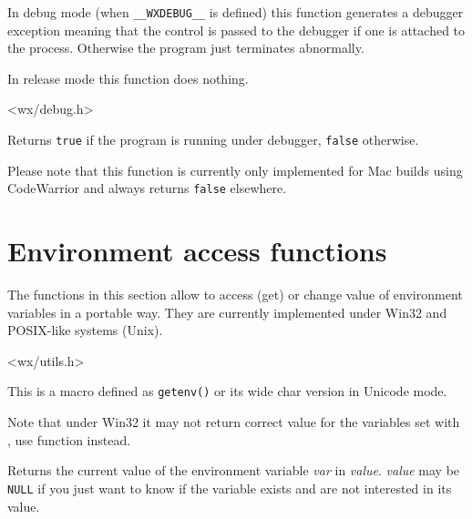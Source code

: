 
In debug mode (when {\tt \_\_WXDEBUG\_\_} is defined) this function generates a
debugger exception meaning that the control is passed to the debugger if one is
attached to the process. Otherwise the program just terminates abnormally.

In release mode this function does nothing.


<wx/debug.h>



\label{wxisdebuggerrunning}


Returns {\tt true} if the program is running under debugger, {\tt false} 
otherwise.

Please note that this function is currently only implemented for Mac builds
using CodeWarrior and always returns {\tt false} elsewhere.




\section{Environment access functions}\label{environfunctions}

The functions in this section allow to access (get) or change value of
environment variables in a portable way. They are currently implemented under
Win32 and POSIX-like systems (Unix).



<wx/utils.h>


\label{wxgetenvmacro}


This is a macro defined as {\tt getenv()} or its wide char version in Unicode
mode.

Note that under Win32 it may not return correct value for the variables set
with , use  function
instead.


\label{wxgetenv}


Returns the current value of the environment variable {\it var} in {\it value}.
{\it value} may be {\tt NULL} if you just want to know if the variable exists
and are not interested in its value.


